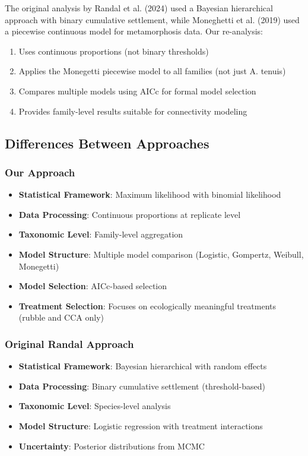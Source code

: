 \documentclass[11pt]{article}
\begin{document}
The original analysis by Randal et al. (2024) used a Bayesian hierarchical approach with binary cumulative settlement, while Moneghetti et al. (2019) used a piecewise continuous model for metamorphosis data. Our re-analysis:

\begin{enumerate}
    \item Uses continuous proportions (not binary thresholds)
    \item Applies the Monegetti piecewise model to all families (not just A. tenuis)
    \item Compares multiple models using AICc for formal model selection
    \item Provides family-level results suitable for connectivity modeling
\end{enumerate}

\subsection{Differences Between Approaches}

\subsubsection{Our Approach}

\begin{itemize}
    \item \textbf{Statistical Framework}: Maximum likelihood with binomial likelihood
    \item \textbf{Data Processing}: Continuous proportions at replicate level
    \item \textbf{Taxonomic Level}: Family-level aggregation
    \item \textbf{Model Structure}: Multiple model comparison (Logistic, Gompertz, Weibull, Monegetti)
    \item \textbf{Model Selection}: AICc-based selection
    \item \textbf{Treatment Selection}: Focuses on ecologically meaningful treatments (rubble and CCA only)
\end{itemize}

\subsubsection{Original Randal Approach}

\begin{itemize}
    \item \textbf{Statistical Framework}: Bayesian hierarchical with random effects
    \item \textbf{Data Processing}: Binary cumulative settlement (threshold-based)
    \item \textbf{Taxonomic Level}: Species-level analysis
    \item \textbf{Model Structure}: Logistic regression with treatment interactions
    \item \textbf{Uncertainty}: Posterior distributions from MCMC
\end{itemize}
\end{document}
